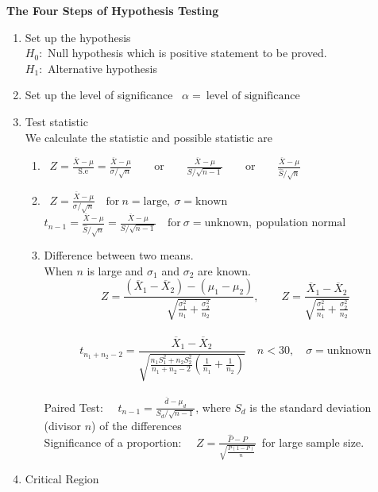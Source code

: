 \documentclass[11pt,a4paper]{article}
\theoremstyle{definition}
\begin{document}
\textbf{The Four Steps of Hypothesis Testing}
\begin{enumerate}
\item Set up the hypothesis\\
$H_0:$ Null hypothesis which is positive statement to be proved.\\
$H_1:$ Alternative hypothesis
\item Set up the level of significance \ $\alpha =\ \text{level of significance}$
\item Test statistic\\ We calculate the statistic and possible statistic are
\begin{enumerate}
  \item \  $Z=\frac{\overline{X}-\mu}{\text{S.e}}=\frac{\overline{X}-\mu}{\sigma/\sqrt{n}}\qquad \text{or}\qquad \frac{\overline{X}-\mu}{S/\sqrt{n-1}}\qquad \text{or}\qquad \frac{\overline{X}-\mu}{\hat{S}/\sqrt{n}}$\\[1ex]
  
  \item \ $Z=\frac{\overline{X}-\mu}{\sigma/\sqrt{n}}\quad \text{for}\ n= \text{large},\  \sigma= \text{known}$\\[1ex]
  
  $t_{n-1}=\frac{\overline{X}-\mu}{\hat{S}/\sqrt{n}}=\frac{\overline{X}-\mu}{S/\sqrt{n-1}}\quad \text{for}\  \sigma =\text{unknown},\ \text{population normal}$\\
  \item Difference between two means.\\ When $n$ is large and $\sigma_1$ and $\sigma_2$ are known.
  \[Z=\frac{(\overline{X}_1-\overline{X}_2)-(\mu_1-\mu_2)}{\sqrt{\frac{\sigma^2_1}{n_1}+\frac{\sigma^2_2}{n_2}}},\qquad  Z=\frac{\overline{X}_1-\overline{X}_2}{\sqrt{\frac{\sigma^2_1}{n_1}+\frac{\sigma^2_2}{n_2}}}\]\\
  \[t_{n_1+n_2-2}=\frac{\overline{X}_1-\overline{X}_2}{\sqrt{\frac{n_1S^2_1+n_2S^2_2}{n_1+n_2-2}\left(\frac{1}{n_1}+\frac{1}{n_2}\right)}}\quad n<30,\quad \sigma= \text{unknown}\]\\
  
  Paired Test: $\quad  t_{n-1}=\frac{\overline{d}-\mu_d}{S_d/\sqrt{n-1}}$, where $S_d$ is the standard deviation (divisor $n$) of the differences\\[1ex]
  
  
  Significance of a proportion: $\quad  Z=\frac{\hat{P}-P}{\sqrt{\frac{P(1-P)}{n}}}$\  for large sample size.\\
\end{enumerate}
\item Critical Region



\end{enumerate}
\end{document}
